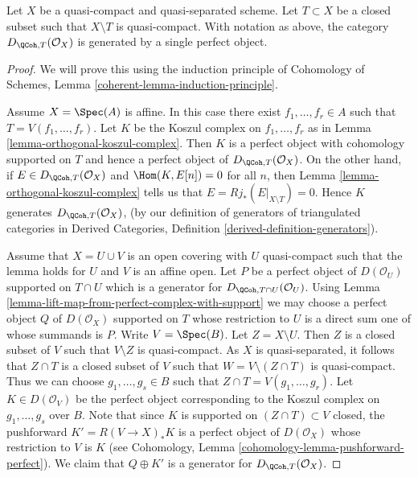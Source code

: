 \begin{lemma}
\label{lemma-generator-with-support}
\begin{reference}
\cite[Theorem 6.8]{Rouquier-dimensions}
\end{reference}
Let $X$ be a quasi-compact and quasi-separated scheme. Let $T \subset X$ be a
closed subset such that $X \setminus T$ is quasi-compact. With notation
as above, the category $D_{\QCoh, T}(\mathcal{O}_X)$ is generated by a
single perfect object.
\end{lemma}

\begin{proof}
We will prove this using the induction principle of
Cohomology of Schemes, Lemma \ref{coherent-lemma-induction-principle}.

\medskip\noindent
Assume $X = \Spec(A)$ is affine. In this case there exist
$f_1, \ldots, f_r \in A$ such that $T = V(f_1, \ldots, f_r)$.
Let $K$ be the Koszul complex on $f_1, \ldots, f_r$ as in
Lemma \ref{lemma-orthogonal-koszul-complex}.
Then $K$ is a perfect object with cohomology supported on
$T$ and hence a perfect object of $D_{\QCoh, T}(\mathcal{O}_X)$.
On the other hand, if $E \in D_{\QCoh, T}(\mathcal{O}_X)$ and
$\Hom(K, E[n]) = 0$ for all $n$, then
Lemma \ref{lemma-orthogonal-koszul-complex}
tells us that $E = Rj_*(E|_{X \setminus T}) = 0$.
Hence $K$ generates $D_{\QCoh, T}(\mathcal{O}_X)$,
(by our definition of generators of triangulated categories in
Derived Categories, Definition \ref{derived-definition-generators}).

\medskip\noindent
Assume that $X = U \cup V$ is an open covering with $U$ quasi-compact
such that the lemma holds for $U$ and $V$ is an affine open.
Let $P$ be a perfect object of $D(\mathcal{O}_U)$ supported on $T \cap U$
which is a generator for $D_{\QCoh, T \cap U}(\mathcal{O}_U)$. Using
Lemma \ref{lemma-lift-map-from-perfect-complex-with-support}
we may choose a perfect object $Q$ of $D(\mathcal{O}_X)$ supported on $T$
whose restriction to $U$ is a direct sum one of whose summands is $P$.
Write $V = \Spec(B)$. Let $Z = X \setminus U$. Then $Z$ is a closed subset
of $V$ such that $V \setminus Z$ is quasi-compact. As $X$ is quasi-separated,
it follows that $Z \cap T$ is a closed subset of $V$ such that
$W = V \setminus (Z \cap T)$ is quasi-compact. Thus we can choose
$g_1, \ldots, g_s \in B$ such that $Z \cap T = V(g_1, \ldots, g_r)$.
Let $K \in D(\mathcal{O}_V)$ be the perfect object corresponding to the
Koszul complex on $g_1, \ldots, g_s$ over $B$. Note that since $K$ is
supported on $(Z \cap T) \subset V$ closed, the pushforward
$K' = R(V \to X)_*K$ is a perfect object of $D(\mathcal{O}_X)$ whose
restriction to $V$ is $K$ (see
Cohomology, Lemma \ref{cohomology-lemma-pushforward-perfect}).
We claim that $Q \oplus K'$ is a generator for
$D_{\QCoh, T}(\mathcal{O}_X)$.


\end{proof}
